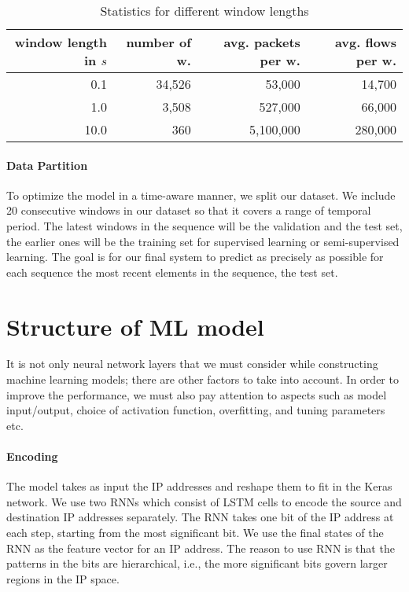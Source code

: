 \begin{table}[htbp!]
\centering
\begin{tabular}{|r|r|r|r|}
\hline
\textbf{window length in $s$} & \textbf{number of w.} & \textbf{avg. packets per w.} & \textbf{avg. flows per w.} \\ \hline
 0.1   & 34,526 &    53,000 &  14,700 \\ 
 1.0   &  3,508 &   527,000 &  66,000 \\ 
10.0   &    360 & 5,100,000 & 280,000 \\ \hline
\end{tabular}
\caption{Statistics for different window lengths}
\label{tab:dataset_stats}
\end{table}

\paragraph{Data Partition}
To optimize the model in a time-aware manner, we split our dataset. We include 20 consecutive windows in our dataset so that it covers a range of temporal period. 
The latest windows in the sequence will be the validation and the test set, the earlier ones will be the training set for supervised learning or semi-supervised learning.
The goal is for our final system to predict as precisely as possible for each sequence the most recent elements in the sequence, the test set. 

\section{Structure of ML model}
It is not only neural network layers that we must consider while constructing machine learning models; there are other factors to take into account. In order to improve the performance, we must also pay attention to aspects such as model input/output, choice of activation function, overfitting, and tuning parameters etc. 

\paragraph{Encoding}
The model takes as input the IP addresses and reshape them to fit in the Keras network. We use two RNNs which consist of LSTM cells to encode the source and destination IP addresses separately. The RNN takes one bit of the IP address at each step, starting from the most significant bit. We use the final states of the RNN as the feature vector for an IP address. The reason to use RNN is that the patterns in the bits are hierarchical, i.e., the more significant bits govern larger regions in the IP space.

